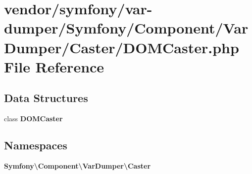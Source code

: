 \section{vendor/symfony/var-\/dumper/\+Symfony/\+Component/\+Var\+Dumper/\+Caster/\+D\+O\+M\+Caster.php File Reference}
\label{_d_o_m_caster_8php}
\subsection*{Data Structures}
\begin{DoxyCompactItemize}
\item 
class {\bf D\+O\+M\+Caster}
\end{DoxyCompactItemize}
\subsection*{Namespaces}
\begin{DoxyCompactItemize}
\item 
 {\bf Symfony\textbackslash{}\+Component\textbackslash{}\+Var\+Dumper\textbackslash{}\+Caster}
\end{DoxyCompactItemize}
